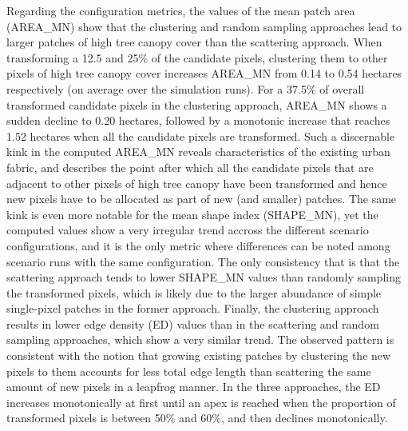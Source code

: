 \documentclass[10pt,letterpaper]{article}
\begin{document}
Regarding the configuration metrics, the values of the mean patch area (AREA\_MN) show that the clustering and random sampling approaches lead to larger patches of high tree canopy cover than the scattering approach.
When transforming a 12.5 and 25\% of the candidate pixels, clustering them to other pixels of high tree canopy cover increases AREA\_MN from 0.14 to 0.54 hectares respectively (on average over the simulation runs). For a 37.5\% of overall transformed candidate pixels in the clustering approach, AREA\_MN shows a sudden decline to 0.20 hectares, followed by a monotonic increase that reaches 1.52 hectares when all the candidate pixels are transformed. Such a discernable kink in the computed AREA\_MN reveals characteristics of the existing urban fabric, and describes the point after which all the candidate pixels that are adjacent to other pixels of high tree canopy have been transformed and hence new pixels have to be allocated as part of new (and smaller) patches.
The same kink is even more notable for the mean shape index (SHAPE\_MN), yet the computed values show a very irregular trend accross the different scenario configurations, and it is the only metric where differences can be noted among scenario runs with the same configuration. The only consistency that is that the scattering approach tends to lower SHAPE\_MN values than randomly sampling the transformed pixels, which is likely due to the larger abundance of simple single-pixel patches in the former approach.
Finally, the clustering approach results in lower edge density (ED) values than in the scattering and random sampling approaches, which show a very similar trend.
The observed pattern is consistent with the notion that growing existing patches by clustering the new pixels to them accounts for less total edge length than scattering the same amount of new pixels in a leapfrog manner.
In the three approaches, the ED increases monotonically at first until an apex is reached when the proportion of transformed pixels is between 50\% and 60\%, and then declines monotonically.
\end{document}
